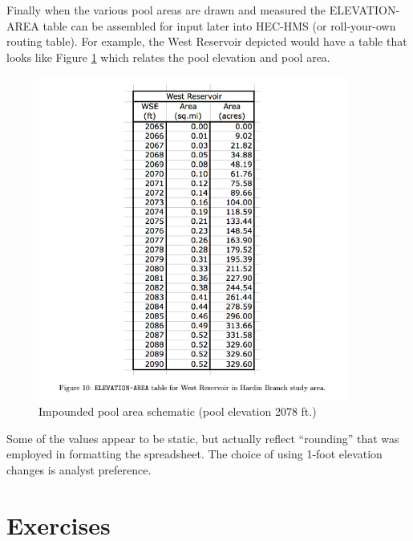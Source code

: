 \documentclass[12pt]{article}
\begin{document}
Finally when the various pool areas are drawn and measured the ELEVATION-AREA table can be assembled for input later into HEC-HMS (or roll-your-own routing table). For example, the West Reservoir depicted would have a table that looks like Figure \ref{fig:fig10} which relates the pool elevation and pool area.


\begin{figure}[h!] %
   \centering
   \includegraphics[width=4.0in]{fig10.png} 
   \caption{Impounded pool area schematic (pool elevation 2078 ft.)}
   \label{fig:fig10}
\end{figure}

Some of the values appear to be static, but actually reflect “rounding” that was employed in formatting the spreadsheet. The choice of using 1-foot elevation changes is analyst preference.
\clearpage

\section*{\small{Exercises}} 
\end{document}
